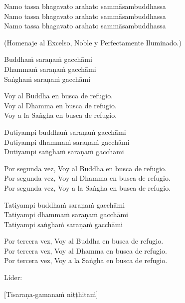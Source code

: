 Namo tassa bhagavato arahato sammāsambuddhassa\\
Namo tassa bhagavato arahato sammāsambuddhassa\\
Namo tassa bhagavato arahato sammāsambuddhassa

\begin{english}
 (Homenaje al Excelso, Noble y Perfectamente Iluminado.)\\
\end{english}

Buddhaṁ saraṇaṁ gacchāmi\\
Dhammaṁ saraṇaṁ gacchāmi\\
Saṅghaṁ saraṇaṁ gacchāmi

\begin{english}
  Voy al Buddha en busca de refugio.\\
  Voy al Dhamma en busca de refugio.\\
  Voy a la Saṅgha en busca de refugio.
\end{english}

Dutiyampi buddhaṁ saraṇaṁ gacchāmi\\
Dutiyampi dhammaṁ saraṇaṁ gacchāmi\\
Dutiyampi saṅghaṁ saraṇaṁ gacchāmi

\begin{english}
  Por segunda vez, Voy al Buddha en busca de refugio.\\
  Por segunda vez, Voy al Dhamma en busca de refugio.\\
  Por segunda vez, Voy a la Saṅgha en busca de refugio.
\end{english}

Tatiyampi buddhaṁ saraṇaṁ gacchāmi\\
Tatiyampi dhammaṁ saraṇaṁ gacchāmi\\
Tatiyampi saṅghaṁ saraṇaṁ gacchāmi

\clearpage

\begin{english}
  Por tercera vez, Voy al Buddha en busca de refugio.\\
  Por tercera vez, Voy al Dhamma en busca de refugio.\\
  Por tercera vez, Voy a la Saṅgha en busca de refugio.
\end{english}

\begin{instruction}
  Líder:
\end{instruction}

[Tisaraṇa-gamanaṁ niṭṭhitaṁ]

